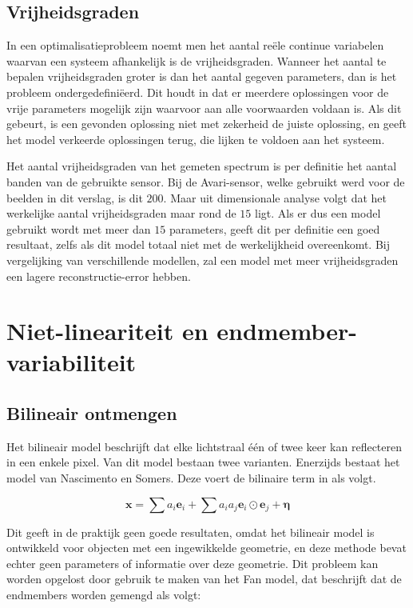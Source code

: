 \documentclass[12pt]{report}
\begin{document}
\section{Vrijheidsgraden} \label{sec:vrij}

In een optimalisatieprobleem noemt men het aantal re\"ele continue variabelen waarvan een systeem afhankelijk is de vrijheidsgraden. Wanneer het aantal te bepalen vrijheidsgraden groter is dan het aantal gegeven parameters, dan is het probleem ondergedefini\"eerd. Dit houdt in dat er meerdere  oplossingen voor de vrije parameters mogelijk zijn waarvoor aan alle voorwaarden voldaan is. Als dit gebeurt, is een gevonden oplossing niet met zekerheid de juiste oplossing, en geeft het model verkeerde oplossingen terug, die lijken te voldoen aan het systeem.

Het aantal vrijheidsgraden van het gemeten spectrum is per definitie het aantal banden van de gebruikte sensor. Bij de Avari-sensor, welke gebruikt werd voor de beelden in dit verslag, is dit $200$. Maar uit dimensionale analyse volgt dat het werkelijke aantal vrijheidsgraden maar rond de $15$ ligt. Als er dus een model gebruikt wordt met meer dan $15$ parameters, geeft dit per definitie een goed resultaat, zelfs als dit model totaal niet met de werkelijkheid overeenkomt. Bij vergelijking van verschillende modellen, zal een model met meer vrijheidsgraden een lagere reconstructie-error hebben. 

\chapter{Niet-lineariteit en endmember-variabiliteit} 

\section{Bilineair ontmengen}

Het bilineair model beschrijft dat elke lichtstraal \'e\'en of twee keer kan reflecteren in een enkele pixel. Van dit model bestaan twee varianten. Enerzijds bestaat het model van Nascimento en Somers\cite{mlinmix}. Deze voert de bilinaire term in als volgt.

\begin{equation}
\bm{x} = \sum a_i \bm{e}_i + \sum a_i a_j \bm{e}_i \odot \bm{e}_j + \bm{\eta}
\end{equation}

Dit geeft in de praktijk geen goede resultaten, omdat het bilineair model is ontwikkeld voor objecten met een ingewikkelde geometrie, en deze methode bevat echter geen parameters of informatie over deze geometrie. Dit probleem kan worden opgelost door gebruik te maken van het Fan model\cite{mlinmix}, dat beschrijft dat de endmembers worden gemengd als volgt:
\end{document}
